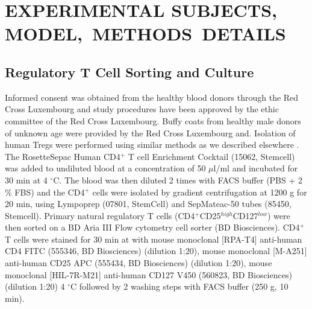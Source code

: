 \documentclass[oneside, 10pt, a4paper, twocolumn]{article}
\begin{document}
{%

\enlargethispage*{\baselineskip}

\section{EXPERIMENTAL SUBJECTS, \mbox{MODEL, METHODS DETAILS}}

\subsection{Regulatory T Cell Sorting and Culture}
Informed consent was obtained from the healthy blood donors through the Red Cross Luxembourg and study procedures have been approved by the ethic committee of the Red Cross Luxembourg. Buffy coats from healthy male donors of unknown age were provided by the Red Cross Luxembourg and. Isolation of human Tregs were performed using similar methods as we described elsewhere \citep{Danileviciute2019.12.20.884809}. The RosetteSepac Human CD4$^{+}$ T cell Enrichment Cocktail (15062, Stemcell) was added to undiluted blood at a concentration of 50 $\mu$l/ml and incubated for 30 min at 4 $^\circ$C. The blood was then diluted 2 times with FACS buffer (PBS + 2$\%$ FBS) and the CD4$^{+}$ cells were isolated by gradient centrifugation at 1200 g for 20 min, using Lympoprep (07801, StemCell) and SepMateac-50 tubes (85450, Stemcell). Primary natural regulatory T cells (CD4$^{+}$CD25$^{high}$CD127$^{low}$) were then sorted on a BD Aria III Flow cytometry cell sorter (BD Biosciences). CD4$^{+}$ T cells were stained for 30 min at with mouse monoclonal [RPA-T4] anti-human CD4 FITC (555346, BD Biosciences) (dilution 1:20), mouse monoclonal [M-A251] anti-human CD25 APC (555434, BD Biosciences) (dilution 1:20), mouse monoclonal [HIL-7R-M21] anti-human CD127 V450 (560823, BD Biosciences) (dilution 1:20) 4 $^\circ$C followed by 2 washing steps with FACS buffer (250 g, 10 min).

}
\end{document}
